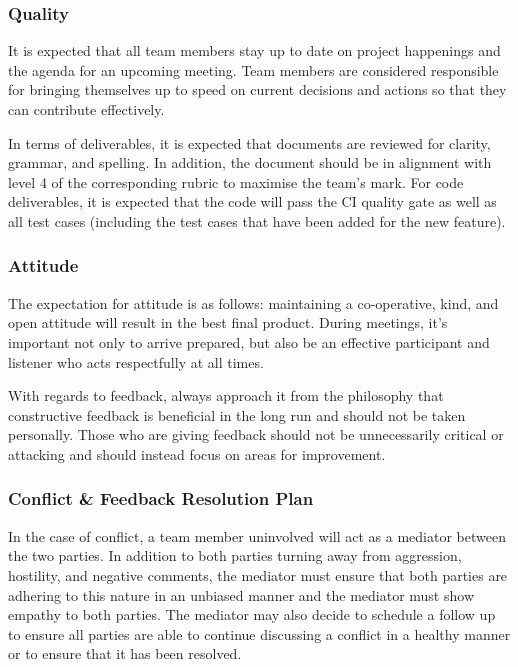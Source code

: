 \documentclass{article}
\begin{document}
\subsubsection*{Quality} 

It is expected that all team members stay up to date on project happenings and the agenda for an upcoming meeting. Team members are considered responsible for bringing themselves up to speed on current decisions and actions so that they can contribute effectively.

In terms of deliverables, it is expected that documents are reviewed for clarity, grammar, and spelling. In addition, the document should be in alignment with level 4 of the corresponding rubric to maximise the team's mark.
For code deliverables, it is expected that the code will pass the CI quality gate as well as all test cases (including the test cases that have been added for the new feature).

\subsubsection*{Attitude}

The expectation for attitude is as follows: maintaining a co-operative, kind, and open attitude will result in the best final product. During meetings, it's important not only to arrive prepared, but also
be an effective participant and listener who acts respectfully at all times.

With regards to feedback, always approach it from the philosophy that constructive feedback is beneficial in the long run and should not be taken personally. Those who are giving feedback should not be unnecessarily
critical or attacking and should instead focus on areas for improvement.

\subsubsection{Conflict \& Feedback Resolution Plan}

In the case of conflict, a team member uninvolved will act as a mediator between the two parties. 
In addition to both parties turning away from aggression, hostility, and negative comments, the mediator 
must ensure that both parties are adhering to this nature in an unbiased manner and the mediator must show empathy to both parties. 
The mediator may also decide to schedule a follow up to ensure all parties are able to continue discussing a conflict in a healthy 
manner or to ensure that it has been resolved.
\end{document}
